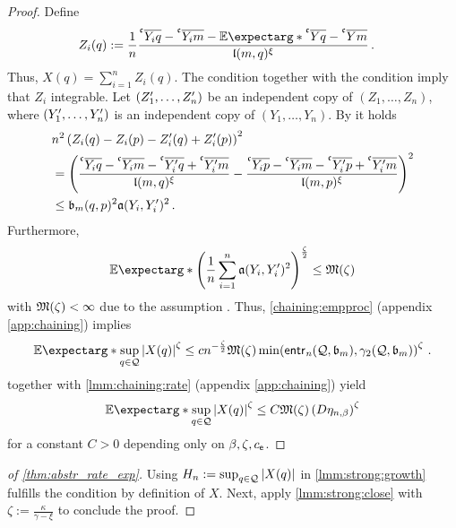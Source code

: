 \begin{proof}
	Define
	\begin{align*}
		Z_i(q) 
		&:= 
		\frac1n \frac{\olc{Y_i}q-\olc{Y_i}m-\Ex*{\olc Yq-\olc Ym}}{\mf l(m, q)^\xi}
		\eqfs
	\end{align*}
	Thus, $X(q) = \sum_{i=1}^n Z_i(q)$.
	The  condition together with the  condition imply that $Z_i$ integrable.
	Let $(Z_1^\prime, \dots, Z_n^\prime)$ be an independent copy of $(Z_1, \dots, Z_n)$, where $(Y_1^\prime, \dots, Y_n^\prime)$ is an independent copy of $(Y_1, \dots, Y_n)$.
	By  it holds
	\begin{align*}
			&
		n^2 \br{Z_i(q)-Z_i(p)-Z_i\pr(q)+Z_i\pr(p)}^2 
		\\&= 
		\br{\frac{\olc{Y_i}q-\olc{Y_i}m-\olc{Y_i\pr}q+\olc{Y_i\pr}m}{\mf l(m,q)^\xi}-\frac{\olc{Y_i}p-\olc{Y_i}m-\olc{Y_i\pr}p+\olc{Y_i\pr}m}{\mf l(m,p)^\xi}}^2
		\\&\leq 
		\mf b_m(q,p)^2 \mf a(Y_i,Y_i\pr)^2
		\eqfs
	\end{align*}
	Furthermore,
	\begin{equation*}
		\Ex*{\br{\frac1n\sum_{i=1}^n \mf a(Y_i, Y_i\pr)^2}^{\frac\zeta2}} \leq \mf M(\zeta)
	\end{equation*}
	with $\mathfrak{M}(\zeta) < \infty$ due to the assumption .
	Thus, \autoref{chaining:empproc} (appendix \autoref{app:chaining}) implies
	\begin{equation*}
		\Ex*{\sup_{q\in\mc Q} \abs{X(q)}^\zeta} \leq c n^{-\frac\zeta2} \mf M(\zeta) \min\brOf{\entrn(\mc Q, \mf b_m), \gamma_2(\mc Q, \mf b_m)}^\zeta \eqfs
	\end{equation*}
	 together with \autoref{lmm:chaining:rate} (appendix \autoref{app:chaining}) yield
	\begin{equation*}
		\Ex*{\sup_{q\in\mc Q} \abs{X(q)}^\zeta} \leq C \mf M(\zeta) \br{D \eta_{n,\beta}}^\zeta
\end{equation*}
	for a constant $C > 0$ depending only on $\beta, \zeta, c_{\mathsf{e}}$.
\end{proof}
%
\begin{proof}[of \autoref{thm:abstr_rate_exp}]
	Using $H_n := \sup_{q\in\mathcal{Q}} \left| X(q) \right|$ in \autoref{lmm:strong:growth} fulfills the  condition by definition of $X$. Next, apply  \autoref{lmm:strong:close} with $\zeta := \frac{\kappa}{\gamma-\xi}$ to conclude the proof.
\end{proof}
%
%
%
